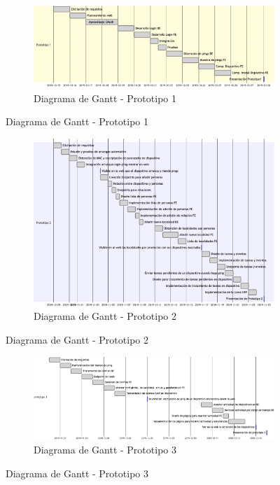 \begin{figure}
\begin{figure}[H]
    \centering
    \includegraphics[width=19cm]{./img/grantt/p1.png}
    \caption{Diagrama de Gantt - Prototipo 1}
    \label{fig:grant.p1}
\end{figure}
\end{figure}

\begin{figure}
\begin{figure}[H]
    \centering
    \includegraphics[width=19cm]{./img/grantt/p2.png}
    \caption{Diagrama de Gantt - Prototipo 2}
    \label{fig:grant.p2}
\end{figure}
\end{figure}

\begin{figure}
\begin{figure}[H]
    \centering
    \includegraphics[width=19cm]{./img/grantt/p3.png}
    \caption{Diagrama de Gantt - Prototipo 3}
    \label{fig:grant.p3}
\end{figure}
\end{figure}

